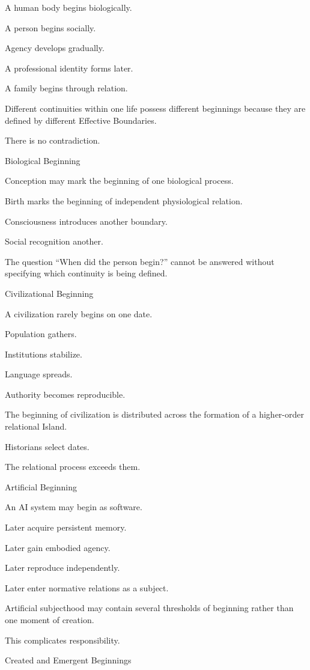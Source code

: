 A human body begins biologically.

A person begins socially.

Agency develops gradually.

A professional identity forms later.

A family begins through relation.

Different continuities within one life possess different beginnings because they are defined by different Effective Boundaries.

There is no contradiction.

Biological Beginning

Conception may mark the beginning of one biological process.

Birth marks the beginning of independent physiological relation.

Consciousness introduces another boundary.

Social recognition another.

The question “When did the person begin?” cannot be answered without specifying which continuity is being defined.

Civilizational Beginning

A civilization rarely begins on one date.

Population gathers.

Institutions stabilize.

Language spreads.

Authority becomes reproducible.

The beginning of civilization is distributed across the formation of a higher-order relational Island.

Historians select dates.

The relational process exceeds them.

Artificial Beginning

An AI system may begin as software.

Later acquire persistent memory.

Later gain embodied agency.

Later reproduce independently.

Later enter normative relations as a subject.

Artificial subjecthood may contain several thresholds of beginning rather than one moment of creation.

This complicates responsibility.

Created and Emergent Beginnings

